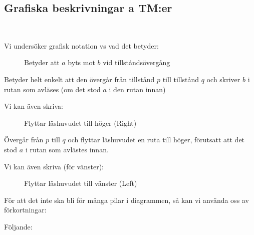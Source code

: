 \subsection{Grafiska beskrivningar a TM:er}\hfill\\\par
\noindent Vi undersöker grafisk notation vs vad det betyder:
\begin{figure}[ht!]
    \centering
    \caption{Betyder att $a$ byts mot $b$ vid tillståndsövergång}
\end{figure}\par
\noindent Betyder helt enkelt att den övergår från tillstånd $p$ till tillstånd $q$ och skriver $b$ i rutan som avläses (om det stod $a$ i den rutan innan)
\par\bigskip
\noindent Vi kan även skriva:
\begin{figure}[ht!]
    \centering
    \caption{Flyttar läshuvudet till höger (Right)}
\end{figure}\par
\noindent Övergår från $p$ till $q$ och flyttar läshuvudet en ruta till höger, förutsatt att det stod $a$ i rutan som avlästes innan.
\par\bigskip
\noindent Vi kan även skriva (för vänster):
\begin{figure}[ht!]
    \centering
    \caption{Flyttar läshuvudet till vänster (Left)}
\end{figure}
\newpage
\noindent För att det inte ska bli för många pilar i diagrammen, så kan vi använda oss av förkortningar:
\par\bigskip
\noindent Följande:
\begin{figure}[ht!]
  \centering
    \caption{}
\end{figure}\par

